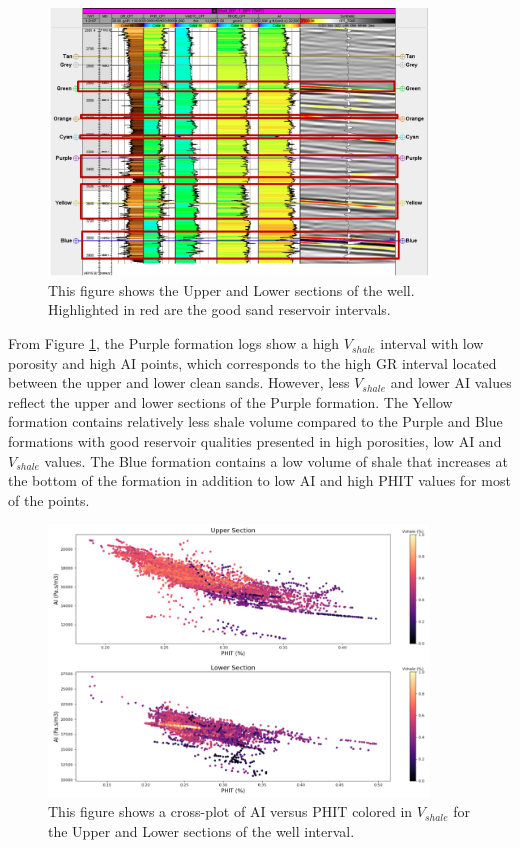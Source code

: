 \documentclass[fleqn]{article}
\begin{document}
\begin{figure}[H]
    \centering
    \includegraphics[width=0.9\textwidth]{Images/UpperAndLower.png}
    \caption{This figure shows the Upper and Lower sections of the well. Highlighted in red are the good sand reservoir intervals.}
    \label{fig:UpperLower}
\end{figure}

From Figure \ref{fig:UpperLower}, the Purple formation logs show a high $V_{shale}$ interval with low porosity and high AI points, which corresponds to the high GR interval located between the upper and lower clean sands. However, less $V_{shale}$ and lower AI values reflect the upper and lower sections of the Purple formation. The Yellow formation contains relatively less shale volume compared to the Purple and Blue formations with good reservoir qualities presented in high porosities, low AI and $V_{shale}$ values. The Blue formation contains a low volume of shale that increases at the bottom of the formation in addition to low AI and high PHIT values for most of the points.

\begin{figure}[H]
    \centering
    \includegraphics[width=0.9\textwidth]{Images/UpperAndLowerCrossplot.png}
    \caption{This figure shows a cross-plot of AI versus PHIT colored in $V_{shale}$ for the Upper and Lower sections of the well interval.}
    \label{fig:UpperLowerCrossplot}
\end{figure}
\end{document}
